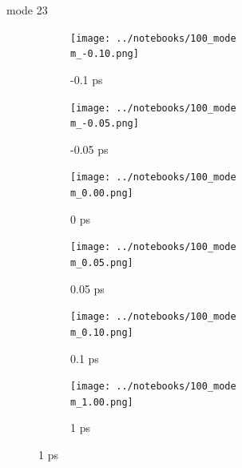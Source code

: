 \documentclass{beamer}
\begin{document}
\renewcommand\m{23}
\begin{frame}{mode \m}
	\begin{figure}
		\centering
		\begin{subfigure}[b]{\w\textwidth}
			\centering
			\texttt{[image: ../notebooks/100\_mode\\m\_-0.10.png]}
			\caption{-0.1 ps}
		\end{subfigure}
		\begin{subfigure}[b]{\w\textwidth}
			\centering
			\texttt{[image: ../notebooks/100\_mode\\m\_-0.05.png]}
			\caption{-0.05 ps}
		\end{subfigure}
		\begin{subfigure}[b]{\w\textwidth}
			\centering
			\texttt{[image: ../notebooks/100\_mode\\m\_0.00.png]}
			\caption{0 ps}
		\end{subfigure}
		\begin{subfigure}[b]{\w\textwidth}
			\centering
			\texttt{[image: ../notebooks/100\_mode\\m\_0.05.png]}
			\caption{0.05 ps}
		\end{subfigure}
		\begin{subfigure}[b]{\w\textwidth}
			\centering
			\texttt{[image: ../notebooks/100\_mode\\m\_0.10.png]}
			\caption{0.1 ps}
		\end{subfigure}
		\begin{subfigure}[b]{\w\textwidth}
			\centering
			\texttt{[image: ../notebooks/100\_mode\\m\_1.00.png]}
			\caption{1 ps}
		\end{subfigure}
	\end{figure}
\end{frame}
\end{document}
